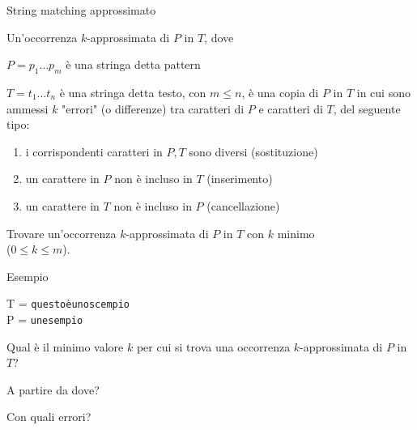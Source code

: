 \begin{frame}{String matching approssimato}

\vspace{-9pt}
\begin{myboxtitle}[Definizione]

Un'\alert{occorrenza $k$-approssimata} di $P$ in $T$, dove
\BI
\item $P = p_1 \ldots p_m$ è una stringa detta \alert{pattern}
\item $T = t_1 \ldots t_n$ è una stringa detta \alert{testo}, con $m \leq n$,
\EI
è una copia di $P$ in $T$ in cui sono ammessi $k$ "errori" (o differenze) tra caratteri di $P$ e caratteri di $T$, del seguente tipo:
\begin{enumerate}
\item i corrispondenti caratteri in $P, T$ sono diversi (\alert{sostituzione}) 
\item un carattere in $P$ non è incluso in $T$ (\alert{inserimento})
\item un carattere in $T$ non è incluso in $P$ (\alert{cancellazione})
\end{enumerate}
\end{myboxtitle}

\begin{myboxtitle}
Trovare un'occorrenza $k$-approssimata di $P$ in $T$ con $k$ minimo\\ 
($0 \leq k \leq m$).
\end{myboxtitle}

\end{frame}

\begin{frame}{Esempio}

\vspace{-9pt}
\begin{myboxtitle}[Esempio]
T = \texttt{questoèunoscempio} \\
P = \texttt{unesempio}
\end{myboxtitle}

\begin{myboxtitle}[Domande]
\BIL
\item Qual è il minimo valore $k$ per cui si trova una occorrenza $k$-approssimata di $P$ in $T$?
\item A partire da dove?
\item Con quali errori?
\EIL
\end{myboxtitle}

\end{frame}


